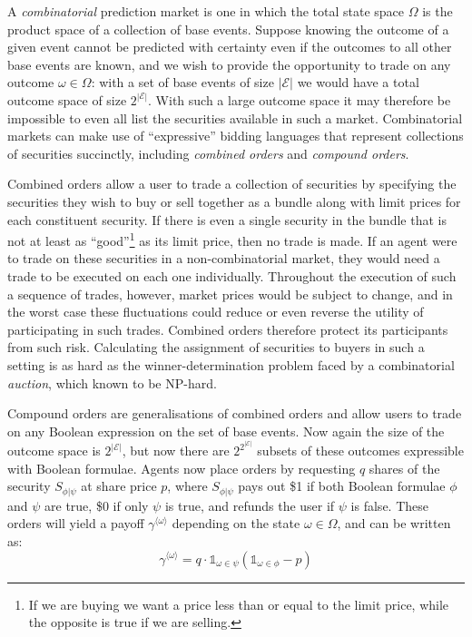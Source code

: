 A \emph{combinatorial} prediction market is one in which the total state space
$\Omega$ is the product space of a collection of base events. Suppose knowing
the outcome of a given event cannot be predicted with certainty even if the
outcomes to all other base events are known, and we wish to provide the
opportunity to trade on any outcome $\omega \in \Omega$: with a set of base
events of size $\mathcal{|E|}$ we would have a total outcome space of size
$2^\mathcal{|E|}$.  With such a large outcome space it may therefore be
impossible to even all list the securities available in such a market.
Combinatorial markets can make use of ``expressive'' bidding languages that
represent collections of securities succinctly, including \emph{combined
orders} and \emph{compound orders}.

Combined orders allow a user to trade a collection of securities by specifying
the securities they wish to buy or sell together as a bundle along with limit
prices for each constituent security. If there is even a single security in the
bundle that is not at least as ``good''\footnote{If we are buying we want a
price less than or equal to the limit price, while the opposite is true if we
are selling.} as its limit price, then no trade is made. If an agent were to
trade on these securities in a non-combinatorial market, they would need a
trade to be executed on each one individually. Throughout the execution of such
a sequence of trades, however, market prices would be subject to change, and in
the worst case these fluctuations could reduce or even reverse the utility of
participating in such trades. Combined orders therefore protect its
participants from such risk. Calculating the assignment of securities to buyers
in such a setting is as hard as the winner-determination problem faced by a
combinatorial \emph{auction}, which known to be NP-hard.

Compound orders are generalisations of combined orders and allow users to trade
on any Boolean expression on the set of base events. Now again the size of the
outcome space is $2^\mathcal{|E|}$, but now there are $2^{2^\mathcal{|E|}}$
subsets of these outcomes expressible with Boolean formulae. Agents now place
orders by requesting $q$ shares of the security $S_{\phi|\psi}$ at share price
$p$, where $S_{\phi|\psi}$ pays out \$1 if both Boolean formulae $\phi$ and
$\psi$ are true, \$0 if only $\psi$ is true, and refunds the user if $\psi$ is
false. These orders will yield a payoff $\gamma^{\langle \omega \rangle}$
depending on the state $\omega \in \Omega$, and can be written as:
%
$$ \gamma^{\langle \omega
\rangle} = q \cdot \mathds{1}_{\omega \in \psi} (\mathds{1}_{\omega \in \phi} -
p) $$

